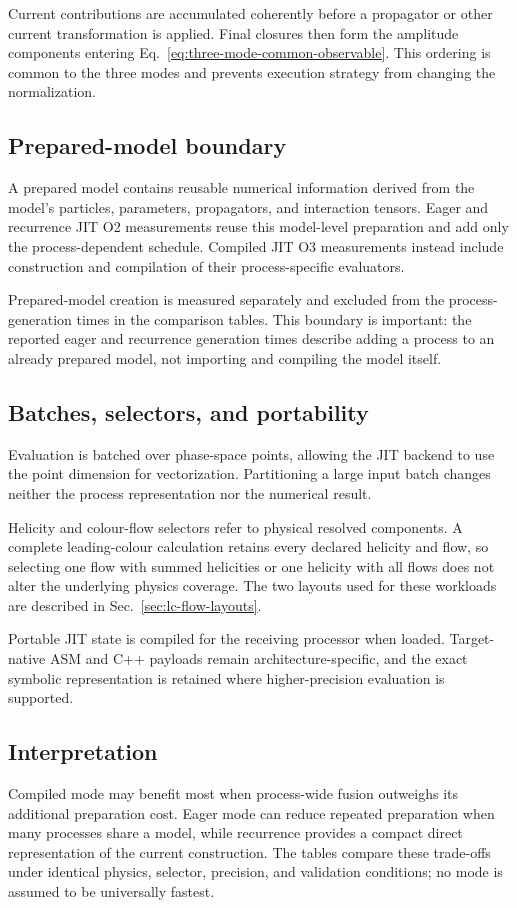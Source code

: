 Current contributions are accumulated coherently before a propagator or other
current transformation is applied. Final closures then form the amplitude
components entering Eq.~\eqref{eq:three-mode-common-observable}. This ordering
is common to the three modes and prevents execution strategy from changing the
normalization.

\subsection{Prepared-model boundary}

A prepared model contains reusable numerical information derived from the
model's particles, parameters, propagators, and interaction tensors. Eager and
recurrence JIT O2 measurements reuse this model-level preparation and add only
the process-dependent schedule. Compiled JIT O3 measurements instead include
construction and compilation of their process-specific evaluators.

Prepared-model creation is measured separately and excluded from the
process-generation times in the comparison tables. This boundary is important:
the reported eager and recurrence generation times describe adding a process
to an already prepared model, not importing and compiling the model itself.

\subsection{Batches, selectors, and portability}

Evaluation is batched over phase-space points, allowing the JIT backend to use
the point dimension for vectorization. Partitioning a large input batch changes
neither the process representation nor the numerical result.

Helicity and colour-flow selectors refer to physical resolved components. A
complete leading-colour calculation retains every declared helicity and flow,
so selecting one flow with summed helicities or one helicity with all flows
does not alter the underlying physics coverage. The two layouts used for these
workloads are described in Sec.~\ref{sec:lc-flow-layouts}.

Portable JIT state is compiled for the receiving processor when loaded.
Target-native ASM and C++ payloads remain architecture-specific, and the exact
symbolic representation is retained where higher-precision evaluation is
supported.

\subsection{Interpretation}

Compiled mode may benefit most when process-wide fusion outweighs its
additional preparation cost. Eager mode can reduce repeated preparation when
many processes share a model, while recurrence provides a compact direct
representation of the current construction. The tables compare these
trade-offs under identical physics, selector, precision, and validation
conditions; no mode is assumed to be universally fastest.
